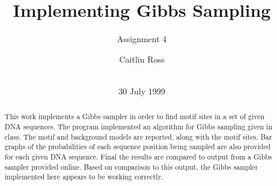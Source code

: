 \documentclass{acm_proc_article-sp}
\begin{document}
\title{Implementing Gibbs Sampling}
\subtitle{Assignment 4}
%
%
%
%
%

%
\author{
	\alignauthor Caitlin Ross\\
	 \\
}

\date{30 July 1999}

\maketitle

\begin{abstract}
This work implements a Gibbs sampler in order to find motif sites in a set of given DNA sequences.  The program implemented an algorithm for Gibbs sampling given in class.  The motif and background models are reported, along with the motif sites.  Bar graphs of the probabilities of each sequence position being sampled are also provided for each given DNA sequence.  Final the results are compared to output from a Gibbs sampler provided online.  Based on comparison to this output, the Gibbs sampler implemented here appears to be working correctly.
\end{abstract}
\end{document}
